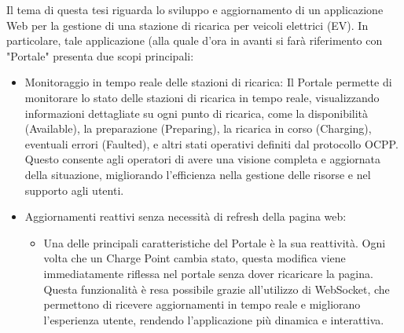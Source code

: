 Il tema di questa tesi riguarda lo sviluppo e aggiornamento di un applicazione Web per la gestione di una stazione di ricarica per veicoli elettrici (EV). In particolare, tale applicazione (alla quale d'ora in avanti si farà riferimento con "Portale" presenta due scopi principali:
\begin{itemize}
	\item Monitoraggio in tempo reale delle stazioni di ricarica: Il Portale permette di monitorare lo 	stato delle stazioni di ricarica in tempo reale, visualizzando informazioni dettagliate su ogni 		punto di ricarica, come la disponibilità (Available), la preparazione (Preparing), la ricarica in 		corso (Charging), eventuali errori (Faulted), e altri stati operativi definiti dal protocollo OCPP. Questo consente agli 			operatori di avere una visione completa e aggiornata della situazione, migliorando l'efficienza 		nella gestione delle risorse e nel supporto agli utenti.
	\item Aggiornamenti reattivi senza necessità di refresh della pagina web: 
		\begin{itemize}
		\item Una delle principali caratteristiche del Portale è la sua reattività. Ogni volta che un 			Charge Point cambia stato, questa modifica viene immediatamente riflessa nel portale senza 				dover ricaricare la pagina. Questa funzionalità è resa possibile grazie all’utilizzo di 				WebSocket, che permettono di ricevere aggiornamenti in tempo reale e migliorano l’esperienza 			utente, rendendo l’applicazione più dinamica e interattiva.	
	\end{itemize}			 
	 
\end{itemize}
